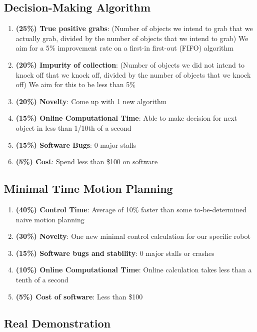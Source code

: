 \documentclass [11pt ]{ report}
\renewcommand{\b}{\textbf}
\begin{document}
\subsection{Decision-Making Algorithm}
\begin{enumerate}

\item \b{(25\%) True positive grabs}: (Number of objects we intend to grab that we actually grab, divided by the number of objects that we intend to grab) We aim for a 5\% improvement rate on a first-in first-out (FIFO) algorithm
\item \textbf{(20\%) Impurity of collection}: (Number of objects we did not intend to knock off that we knock off, divided by the number of objects that we knock off)  We aim for this to be less than 5\%
\item \textbf{(20\%) Novelty}: Come up with 1 new algorithm
\item \textbf{(15\%) Online Computational Time}: Able to make decision for next object in less than 1/10th of a second
\item \textbf{(15\%) Software Bugs}: 0 major stalls 
\item \textbf{(5\%) Cost}: Spend less than \$100 on software

\end{enumerate}

\subsection{Minimal Time Motion Planning}

\begin{enumerate}

\item \textbf{(40\%) Control Time}: Average of 10\% faster than some to-be-determined naive motion planning 
\item \textbf{(30\%) Novelty}: One new  minimal control calculation for our specific robot
\item \textbf{(15\%) Software bugs and stability}: 0 major stalls or crashes
\item \textbf{(10\%) Online Computational Time}: Online calculation takes less than a tenth of a second
\item \textbf{(5\%) Cost of software}: Less than \$100

\end{enumerate}

\subsection{Real Demonstration}
\end{document}

